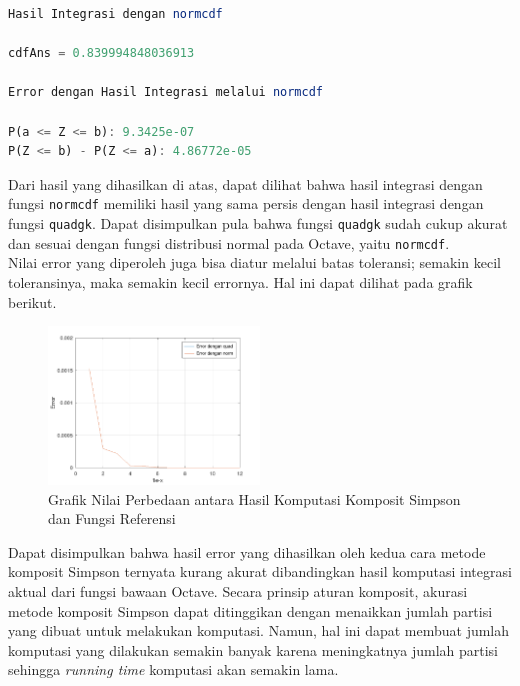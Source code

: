 \documentclass[journal,12pt,onecolumn,a4paper]{IEEEtran}
\begin{document}
\begin{center}
	\begin{lstlisting}[language=Octave]
Hasil Integrasi dengan normcdf

cdfAns = 0.839994848036913

Error dengan Hasil Integrasi melalui normcdf

P(a <= Z <= b): 9.3425e-07
P(Z <= b) - P(Z <= a): 4.86772e-05
	\end{lstlisting}
\end{center}

Dari hasil yang dihasilkan di atas, dapat dilihat bahwa hasil integrasi dengan fungsi \lstinline{normcdf} memiliki hasil yang sama persis dengan hasil integrasi dengan fungsi \lstinline{quadgk}. Dapat disimpulkan pula bahwa fungsi \lstinline{quadgk} sudah cukup akurat dan sesuai dengan fungsi distribusi normal pada Octave, yaitu \lstinline{normcdf}.\\

Nilai error yang diperoleh juga bisa diatur melalui batas toleransi; semakin kecil toleransinya, maka semakin kecil errornya. Hal ini dapat dilihat pada grafik berikut.

\begin{figure}[h]
	\centering
	\includegraphics[width=0.5\textwidth]{comp_simp_tol}
	\caption{Grafik Nilai Perbedaan antara Hasil Komputasi Komposit Simpson dan Fungsi Referensi}
	\label{fig:difGraph}
\end{figure}

Dapat disimpulkan bahwa hasil error yang dihasilkan oleh kedua cara metode komposit Simpson ternyata kurang akurat dibandingkan hasil komputasi integrasi aktual dari fungsi bawaan Octave. Secara prinsip aturan komposit, akurasi metode komposit Simpson dapat ditinggikan dengan menaikkan jumlah partisi yang dibuat untuk melakukan komputasi. Namun, hal ini dapat membuat jumlah komputasi yang dilakukan semakin banyak karena meningkatnya jumlah partisi sehingga \emph{running time} komputasi akan semakin lama.
\end{document}
